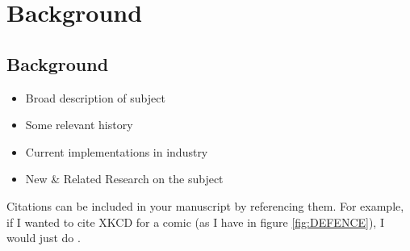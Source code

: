 
\glsresetall %
\chapter[Background]{Background}\label{ch:Background}

\section{Background}
\begin{itemize}
	\item{Broad description of subject}
	\item{Some relevant history}
	\item{Current implementations in industry}
	\item{New \& Related Research on the subject}
\end{itemize}

Citations can be included in your manuscript by referencing them. For example, if I wanted to cite XKCD for a comic (as I have in figure \ref{fig:DEFENCE}), I would just do \cite{xkcdThesis}.